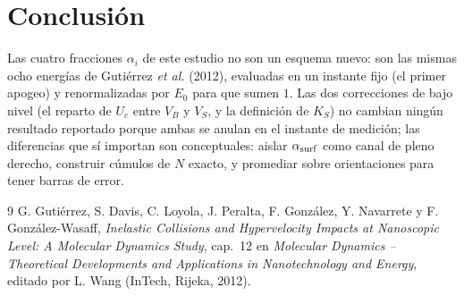 \documentclass[11pt,a4paper]{article}
\begin{document}
\section{Conclusión}

Las cuatro fracciones $\alpha_i$ de este estudio no son un esquema nuevo:
son las mismas ocho energías de Gutiérrez \emph{et al.} (2012), evaluadas
en un instante fijo (el primer apogeo) y renormalizadas por $E_0$ para que
sumen $1$. Las dos correcciones de bajo nivel (el reparto de $U_c$ entre
$V_B$ y $V_S$, y la definición de $K_S$) no cambian ningún resultado
reportado porque ambas se anulan en el instante de medición; las
diferencias que sí importan son conceptuales: aislar $\alpha_{\rm surf}$
como canal de pleno derecho, construir cúmulos de $N$ exacto, y promediar
sobre orientaciones para tener barras de error.

\begin{thebibliography}{9}
G. Gutiérrez, S. Davis, C. Loyola, J. Peralta, F. González, Y. Navarrete
y F. González-Wasaff, \textit{Inelastic Collisions and Hypervelocity
Impacts at Nanoscopic Level: A Molecular Dynamics Study}, cap.~12 en
\textit{Molecular Dynamics -- Theoretical Developments and Applications
in Nanotechnology and Energy}, editado por L. Wang (InTech, Rijeka, 2012).
\end{thebibliography}
\end{document}
